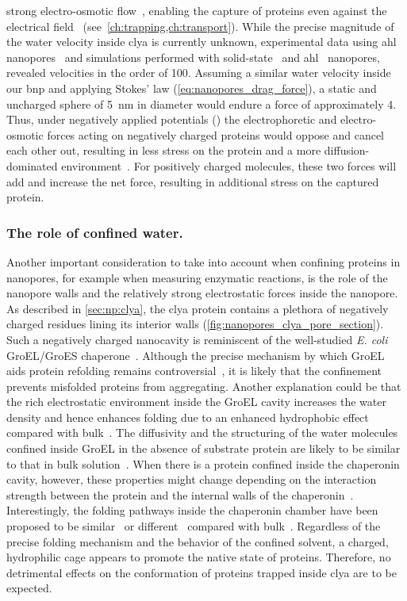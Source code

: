 strong electro-osmotic flow~\cite{Franceschini-2016}, enabling the capture of proteins even against the
electrical field~\cite{Soskine-2012} (see~\cref{ch:trapping,ch:transport}). While the precise magnitude of the
water velocity inside \gls{clya} is currently unknown, experimental data using \gls{ahl}
nanopores~\cite{Paula-1999} and simulations performed with solid-state~\cite{vanDorp-2009,Luan-2008} and
\gls{ahl}~\cite{Aksimentiev-2005,Pederson-2015} nanopores, revealed velocities in the order of
\SI{100}{\mmps}. Assuming a similar water velocity inside our \gls{bnp} and applying Stokes' law
(\cref{eq:nanopores_drag_force}), a static and uncharged sphere of \SI{5}{\nm} in diameter would endure a
force of approximately \SI{4}{\pN}. Thus, under negatively applied potentials (\transi{}) the electrophoretic
and electro-osmotic forces acting on negatively charged proteins would oppose and cancel each other out,
resulting in less stress on the protein and a more diffusion-dominated environment~\cite{Firnkes-2010}. For
positively charged molecules, these two forces will add and increase the net force, resulting in additional
stress on the captured protein.

\subsubsection{The role of confined water.}
%

Another important consideration to take into account when confining proteins in nanopores, for example when
measuring enzymatic reactions, is the role of the nanopore walls and the relatively strong electrostatic
forces inside the nanopore. As described in \cref{sec:np:clya}, the \gls{clya} protein contains a plethora of
negatively charged residues lining its interior walls (\cref{fig:nanopores_clya_pore_section}). Such a
negatively charged nanocavity is reminiscent of the well-studied \textit{E. coli} {GroEL/GroES}
chaperone~\cite{Xu-1997}. Although the precise mechanism by which {GroEL} aids protein refolding remains
controversial~\cite{England-2008,England-2008b,Motojima-2012,Weber-2013}, it is likely that the confinement
prevents misfolded proteins from aggregating. Another explanation could be that the rich electrostatic
environment inside the {GroEL} cavity increases the water density and hence enhances folding due to an
enhanced hydrophobic effect compared with bulk~\cite{England-2008,England-2008b}. The diffusivity and the
structuring of the water molecules confined inside {GroEL} in the absence of substrate protein are likely to
be similar to that in bulk solution~\cite{Franck-2014}. When there is a protein confined inside the chaperonin
cavity, however, these properties might change depending on the interaction strength between the protein and
the internal walls of the chaperonin~\cite{Weber-2013}. Interestingly, the folding pathways inside the
chaperonin chamber have been proposed to be similar~\cite{Horst-2007} or different~\cite{Jewett-2004} compared
with bulk~\cite{Apetri-2008}. Regardless of the precise folding mechanism and the behavior of the confined
solvent, a charged, hydrophilic cage appears to promote the native state of proteins. Therefore, no
detrimental effects on the conformation of proteins trapped inside \gls{clya} are to be expected.


